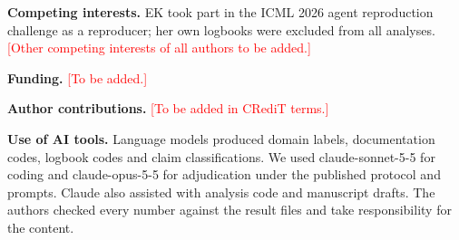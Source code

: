 \documentclass[11pt]{article}
\newcommand{\todo}[1]{\textcolor{red}{#1}}
\begin{document}
\textbf{Competing interests.} EK took part in the ICML 2026 agent reproduction challenge as a reproducer; her own logbooks were excluded from all analyses. \todo{[Other competing interests of all authors to be added.]}

\textbf{Funding.} \todo{[To be added.]}

\textbf{Author contributions.} \todo{[To be added in CRediT terms.]}

\textbf{Use of AI tools.} Language models produced domain labels, documentation codes, logbook codes and claim classifications. We used claude-sonnet-5-5 for coding and claude-opus-5-5 for adjudication under the published protocol and prompts. Claude also assisted with analysis code and manuscript drafts. The authors checked every number against the result files and take responsibility for the content.
\end{document}
